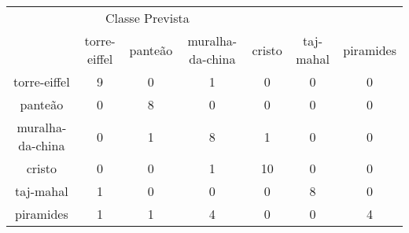 \begin{tabular}{|c|c|c|c|c|c|c|}
\hline
\multicolumn{5}{|c|}{Classe Prevista}\\
 & torre-eiffel & panteão & muralha-da-china & cristo & taj-mahal & piramides\\
torre-eiffel & 9 & 0 & 1 & 0 & 0 & 0\\
panteão & 0 & 8 & 0 & 0 & 0 & 0\\
muralha-da-china & 0 & 1 & 8 & 1 & 0 & 0\\
cristo & 0 & 0 & 1 & 10 & 0 & 0\\
taj-mahal & 1 & 0 & 0 & 0 & 8 & 0\\
piramides & 1 & 1 & 4 & 0 & 0 & 4\\
\end{tabular}
